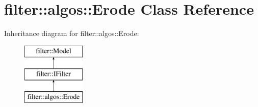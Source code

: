 \hypertarget{classfilter_1_1algos_1_1_erode}{}\section{filter\+:\+:algos\+:\+:Erode Class Reference}
\label{classfilter_1_1algos_1_1_erode}
Inheritance diagram for filter\+:\+:algos\+:\+:Erode\+:\begin{figure}[H]
\begin{center}
\leavevmode
\includegraphics[height=3.000000cm]{d5/dc3/classfilter_1_1algos_1_1_erode}
\end{center}
\end{figure}
